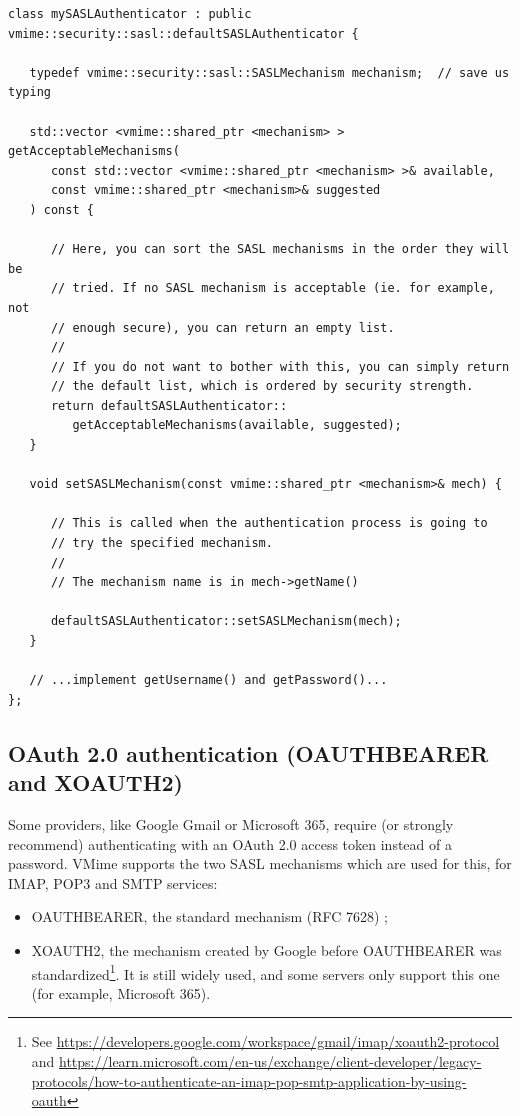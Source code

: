 \begin{lstlisting}[caption={A simple SASL authenticator}]
class mySASLAuthenticator : public vmime::security::sasl::defaultSASLAuthenticator {

   typedef vmime::security::sasl::SASLMechanism mechanism;  // save us typing

   std::vector <vmime::shared_ptr <mechanism> > getAcceptableMechanisms(
      const std::vector <vmime::shared_ptr <mechanism> >& available,
      const vmime::shared_ptr <mechanism>& suggested
   ) const {

      // Here, you can sort the SASL mechanisms in the order they will be
      // tried. If no SASL mechanism is acceptable (ie. for example, not
      // enough secure), you can return an empty list.
      //
      // If you do not want to bother with this, you can simply return
      // the default list, which is ordered by security strength.
      return defaultSASLAuthenticator::
         getAcceptableMechanisms(available, suggested);
   }

   void setSASLMechanism(const vmime::shared_ptr <mechanism>& mech) {

      // This is called when the authentication process is going to
      // try the specified mechanism.
      //
      // The mechanism name is in mech->getName()

      defaultSASLAuthenticator::setSASLMechanism(mech);
   }

   // ...implement getUsername() and getPassword()...
};
\end{lstlisting}

\subsection{OAuth 2.0 authentication (OAUTHBEARER and XOAUTH2)\label{net-oauth2}} %

Some providers, like Google Gmail or Microsoft 365, require (or strongly
recommend) authenticating with an OAuth 2.0 access token instead of a
password. VMime supports the two SASL mechanisms which are used for this,
for IMAP, POP3 and SMTP services:

\begin{itemize}
\item OAUTHBEARER, the standard mechanism (RFC 7628) ;
\item XOAUTH2, the mechanism created by Google before OAUTHBEARER was
standardized\footnote{See \url{https://developers.google.com/workspace/gmail/imap/xoauth2-protocol}
and
\url{https://learn.microsoft.com/en-us/exchange/client-developer/legacy-protocols/how-to-authenticate-an-imap-pop-smtp-application-by-using-oauth}}.
It is still widely used, and some servers only support this one (for
example, Microsoft 365).
\end{itemize}

